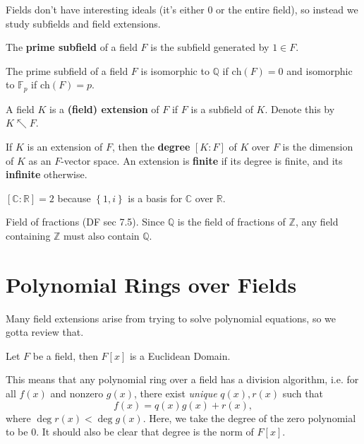 \documentclass[10pt]{report}
\begin{document}
Fields don't have interesting ideals (it's either 0 or the entire field), so instead we study subfields and field extensions.

\begin{defn}[]
	The \textbf{prime subfield} of a field $F$ is the subfield generated by $1 \in F$.
\end{defn}

\begin{prop}
	The prime subfield of a field $F$ is isomorphic to $\mathbb{Q}$ if $\text{ch}(F)=0$ and isomorphic to $\mathbb{F}_{p}$ if $\text{ch}(F)=p$.
\end{prop}

\begin{defn}[]
	A field $K$ is a \textbf{(field) extension} of $F$ if $F$ is a subfield of $K$. Denote this by $K\nwarrow F$.
\end{defn}

\begin{defn}
	If $K$ is an extension of $F$, then the \textbf{degree} $[K:F]$ of $K$ over $F$ is the dimension of $K$ as an $F$-vector space. An extension is \textbf{finite} if its degree is finite, and its \textbf{infinite} otherwise.
\end{defn}

\begin{ex}[]
	$[\mathbb{C}:\mathbb{R}]=2$ because $\left\{ 1,i \right\}$ is a basis for $\mathbb{C}$ over $\mathbb{R}$.
\end{ex}

{\color{red}Field of fractions (DF sec 7.5). Since $\mathbb{Q}$ is the field of fractions of $\mathbb{Z}$, any field containing $\mathbb{Z}$ must also contain $\mathbb{Q}$.}


\section{Polynomial Rings over Fields}

Many field extensions arise from trying to solve polynomial equations, so we gotta review that.

\begin{thrm}[]
	Let $F$ be a field, then $F[x]$ is a Euclidean Domain.
\end{thrm}

This means that any polynomial ring over a field has a division algorithm, i.e. for all $f(x)$ and nonzero $g(x)$, there exist \textit{unique} $q(x), r(x)$ such that
\[
	f(x)=q(x)g(x)+r(x),
\] where $\deg r(x) < \deg g(x)$. Here, we take the degree of the zero polynomial to be 0. It should also be clear that degree is the norm of $F[x]$.
\end{document}
